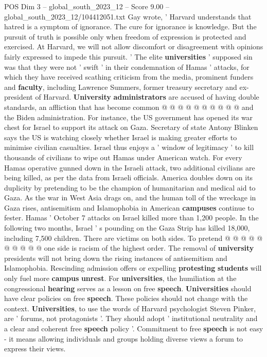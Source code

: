 \begin{textsample}{POS Dim 3 – global\_south\_2023\_12 – Score 9.00 – global\_south\_2023\_12/104412051.txt}
Gay wrote, ' Harvard understands that hatred is a symptom of ignorance.
The cure for ignorance is knowledge.
But the pursuit of truth is possible only when freedom of expression is protected and exercised.
At Harvard, we will not allow discomfort or disagreement with opinions fairly expressed to impede this pursuit. ' The elite \textbf{universities} ' supposed sin was that they were not ' swift ' in their condemnation of Hamas ' attacks, for which they have received scathing criticism from the media, prominent funders and \textbf{faculty}, including Lawrence Summers, former treasury secretary and ex-president of Harvard. \textbf{University} \textbf{administrators} are accused of having double standards, an affliction that has become common @ @ @ @ @ @ @ @ @ @ and the Biden administration.
For instance, the US government has opened its war chest for Israel to support its attack on Gaza.
Secretary of state Antony Blinken says the US is watching closely whether Israel is making greater efforts to minimise civilian casualties.
Israel thus enjoys a ' window of legitimacy ' to kill thousands of civilians to wipe out Hamas under American watch.
For every Hamas operative gunned down in the Israeli attack, two additional civilians are being killed, as per the data from Israeli officials.
America doubles down on its duplicity by pretending to be the champion of humanitarian and medical aid to Gaza.
As the war in West Asia drags on, and the human toll of the wreckage in Gaza rises, antisemitism and Islamophobia in American \textbf{campuses} continue to fester.
Hamas ' October 7 attacks on Israel killed more than 1,200 people.
In the following two months, Israel ' s pounding on the Gaza Strip has killed 18,000, including 7,500 children.
There are victims on both sides.
To pretend @ @ @ @ @ @ @ @ @ @ one side is racism of the highest order.
The removal of \textbf{university} presidents will not bring down the rising instances of antisemitism and Islamophobia.
Rescinding admission offers or expelling \textbf{protesting} \textbf{students} will only fuel more \textbf{campus} \textbf{unrest}.
For \textbf{universities}, the humiliation at the congressional \textbf{hearing} serves as a lesson on free \textbf{speech}. \textbf{Universities} should have clear policies on free \textbf{speech}.
These policies should not change with the context. \textbf{Universities}, to use the words of Harvard psychologist Steven Pinker, are ' forums, not protagonists '.
They should adopt ' institutional neutrality and a clear and coherent free \textbf{speech} policy '.
Commitment to free \textbf{speech} is not easy - it means allowing individuals and groups holding diverse views a forum to express their views.

\end{textsample}
